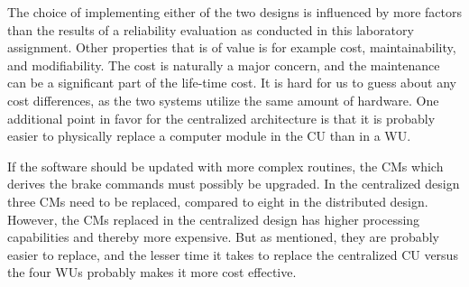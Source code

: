 The choice of implementing either of the two designs is influenced by more factors than the results of a reliability evaluation as conducted in this laboratory assignment. Other properties that is of value is for example cost, maintainability, and modifiability. The cost is naturally a major concern, and the maintenance can be a significant part of the life-time cost. It is hard for us to guess about any cost differences, as the two systems utilize the same amount of hardware. One additional point in favor for the centralized architecture is that it is probably easier to physically replace a computer module in the CU than in a WU. 

If the software should be updated with more complex routines, the CMs which derives the brake commands must possibly be upgraded. In the centralized design three CMs need to be replaced, compared to eight in the distributed design. However, the CMs replaced in the centralized design has higher processing capabilities and thereby more expensive. But as mentioned, they are probably easier to replace, and the lesser time it takes to replace the centralized CU versus the four WUs probably makes it more cost effective. 